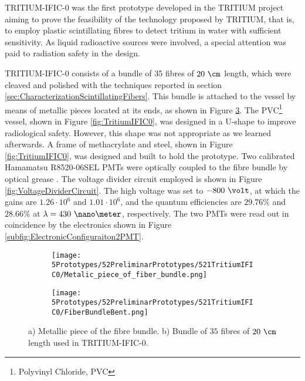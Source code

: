 TRITIUM-IFIC-0 was the first prototype developed in the TRITIUM project aiming to prove the feasibility of the technology proposed by TRITIUM, that is, to employ plastic scintillating fibres to detect tritium in water with sufficient sensitivity. As liquid radioactive sources were involved, a special attention was paid to radiation safety in the design.

TRITIUM-IFIC-0 consists of a bundle of 35 fibres of $20~\cm$ length, which were cleaved and polished with the techniques reported in section \ref{sec:CharacterizationScintillatingFibers}. This bundle is attached to the vessel by means of metallic pieces located at its ends, as shown in Figure \ref{fig:FiberBundleOfTritiumIFIC0}. The PVC\footnote{Polyvinyl Chloride, PVC} vessel, shown in Figure \ref{fig:TritiumIFIC0}, was designed in a U-shape to improve radiological safety. However, this shape was not appropriate as we learned afterwards. A frame of methacrylate and steel, shown in Figure \ref{fig:TritiumIFIC0}, was designed and built to hold the prototype. Two calibrated Hamamatsu R8520-06SEL PMTs \cite{DataSheetPMTs} were optically coupled to the fibre bundle by optical grease \cite{OpticalGrease}. The voltage divider circuit employed is shown in Figure  \ref{fig:VoltageDividerCircuit}. The high voltage was set to $-800~\volt$, at which the gains are $1.26 \cdot{} 10^6$ and $1.01 \cdot{} 10^6$, and the quantum efficiencies are $29.76\%$ and $28.66\%$ at $\lambda=430~\nano\meter$, respectively. The two PMTs were read out in coincidence by the electronics shown in Figure \ref{subfig:ElectronicConfiguraiton2PMT}.

\begin{figure}
\centering
    \begin{subfigure}[b]{0.5\textwidth}
    \centering
    \texttt{[image: 5Prototypes/52PreliminarPrototypes/521TritiumIFIC0/Metalic\_piece\_of\_fiber\_bundle.png]}  
    \caption{\label{subfig:MetalicPieceFiberBunchTritiumIFIC0}}
    \end{subfigure}
    \hfill
    \begin{subfigure}[b]{0.4\textwidth}
    \centering
    \texttt{[image: 5Prototypes/52PreliminarPrototypes/521TritiumIFIC0/FiberBundleBent.png]}  
    \caption{\label{subfig:FiberBunchTritiumIFIC0Bent}}
    \end{subfigure}
 \caption{a) Metallic piece of the fibre bundle. b) Bundle of $35$ fibres of $20~\cm$ length used in TRITIUM-IFIC-0.} \label{fig:FiberBundleOfTritiumIFIC0}
\end{figure}

